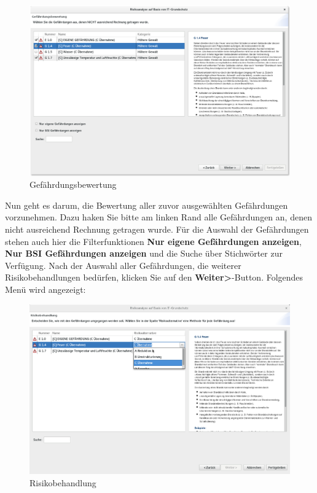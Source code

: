 \documentclass[a4paper,10pt]{book}
\begin{document}
\newline
\begin{figure}[htb!]
  \centering
  \includegraphics[width=\textwidth]{Screenshot/Gefaehrdungsbewertung.png}
  \caption{\label{Gefaehrdungsbewertung} Gefährdungsbewertung}
\end{figure}
\newline
Nun geht es darum, die Bewertung aller zuvor ausgewählten Gefährdungen vorzunehmen. Dazu haken Sie bitte am linken Rand alle Gefährdungen an, denen nicht ausreichend Rechnung getragen wurde. Für die Auswahl der Gefährdungen stehen auch hier die Filterfunktionen \textbf{Nur eigene Gefährdungen anzeigen}, \textbf{Nur BSI Gefährdungen anzeigen} und die Suche über Stichwörter zur Verfügung. Nach der Auswahl aller Gefährdungen, die weiterer Risikobehandlungen bedürfen, klicken Sie auf den \textbf{Weiter\textgreater}-Button. Folgendes Menü wird angezeigt:
\newline
\begin{figure}[htb!]
  \centering
  \includegraphics[width=\textwidth]{Screenshot/Risikobehandlung.png}
  \caption{\label{Risikobehandlung} Risikobehandlung}
\end{figure}
\end{document}

